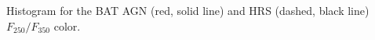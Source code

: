 \label{fig:hist_250_350_color} Histogram for the BAT AGN (red, solid line) and HRS (dashed, black line) $F_{250}/F_{350}$ color. 